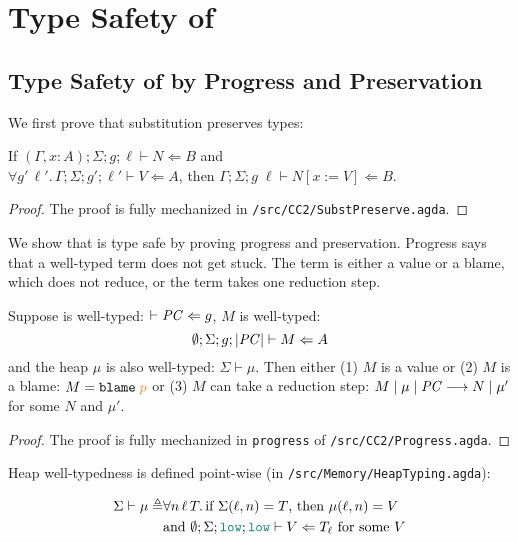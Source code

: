 \chapter{Type Safety of \Surface}
\label{ch:type-safety}

\section{Type Safety of \CC by Progress and Preservation}
\label{sec:cc-type-safety}

We first prove that substitution preserves types:

\begin{lemma}
  \label{lem:subst-pres}
  If $(\Gamma,x{:}A);\Sigma;g;\ell\vdash N \Leftarrow B$ and \\
  $\forall g'\,\ell'.\,\Gamma;\Sigma;g';\ell' \vdash V \Leftarrow A$, then
  $\Gamma;\Sigma;g\;\ell \vdash N[x:=V] \Leftarrow B$.
\end{lemma}
\begin{proof}
  The proof is fully mechanized in \texttt{/src/CC2/SubstPreserve.agda}.
\end{proof}

We show that \CC is type safe by proving progress and preservation. Progress
says that a well-typed \CC term does not get stuck. The term is either a value
or a blame, which does not reduce, or the term takes one reduction step.

\begin{theorem}[Progress]
\label{thm:progress}
Suppose \PC is well-typed: $\vdash \mathit{PC} \Leftarrow g$,
$M$ is well-typed:
\[
\emptyset ; \Sigma ; g ; | \mathit{PC} | \vdash M \Leftarrow A
\]
and the heap $\mu$ is also well-typed: $\Sigma \vdash \mu$.
Then either (1) $M$ is a value or (2) $M$ is a blame: {\normalfont $M = \blame{p}$}
or (3) $M$ can take a reduction step:
${M}\mid{\mu}\mid{\ensuremath{\mathit{PC}}}\longrightarrow{N}\mid{\mu'}$ for some $N$ and $\mu'$.
\end{theorem}
\begin{proof}
  The proof is fully mechanized in \texttt{progress} of \texttt{/src/CC2/Progress.agda}.
\end{proof}

Heap well-typedness is defined point-wise (in \texttt{/src/Memory/HeapTyping.agda}):

\begin{align*}
\Sigma \vdash \mu \triangleq & \forall n\,\ell\,T.\,\text{if}~\Sigma(\ell,n)=T \text{, then}~\mu(\ell,n)=V \\
& \text{and}~\emptyset;\Sigma;\low;\low\vdash V \Leftarrow T_{\ell} ~\text{for some}~ V
\end{align*}

